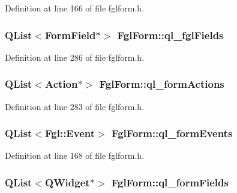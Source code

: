 Definition at line 166 of file fglform.h.

\hypertarget{classFglForm_a1d775e481b65ae50b2a557fa9ae975c5}{
\subsubsection[{ql\_\-fglFields}]{\setlength{\rightskip}{0pt plus 5cm}QList$<${\bf FormField}$\ast$$>$ {\bf FglForm::ql\_\-fglFields}}}
\label{classFglForm_a1d775e481b65ae50b2a557fa9ae975c5}


Definition at line 286 of file fglform.h.

\hypertarget{classFglForm_a091b50c03ba4a353485d34ea34f4001a}{
\subsubsection[{ql\_\-formActions}]{\setlength{\rightskip}{0pt plus 5cm}QList$<${\bf Action}$\ast$$>$ {\bf FglForm::ql\_\-formActions}}}
\label{classFglForm_a091b50c03ba4a353485d34ea34f4001a}


Definition at line 283 of file fglform.h.

\hypertarget{classFglForm_aec60babfa521575768a4aa1147318ba1}{
\subsubsection[{ql\_\-formEvents}]{\setlength{\rightskip}{0pt plus 5cm}QList$<${\bf Fgl::Event}$>$ {\bf FglForm::ql\_\-formEvents}}}
\label{classFglForm_aec60babfa521575768a4aa1147318ba1}


Definition at line 168 of file fglform.h.

\hypertarget{classFglForm_ad0adbaabeb97d6fabd2a23f5ac5c0069}{
\subsubsection[{ql\_\-formFields}]{\setlength{\rightskip}{0pt plus 5cm}QList$<$QWidget$\ast$$>$ {\bf FglForm::ql\_\-formFields}}}
\label{classFglForm_ad0adbaabeb97d6fabd2a23f5ac5c0069}


